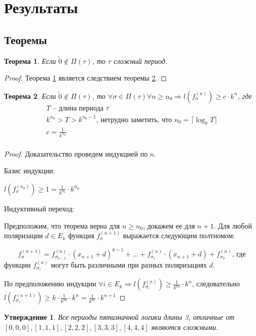 \documentclass[bibliography=totoc, a4paper, 14pt]{extarticle}
\let\stdsection\section
\renewcommand\section{\newpage\stdsection}
\newtheorem{myth}{Теорема}
\newtheorem*{myst}{Утверждение}
\begin{document}
\section{Результаты}
\subsection{Теоремы}
\begin{myth}
\label{th1}
Если $\tilde{0} \not\in \Pi(\tau)$, то $\tau$ сложный период.
\end{myth}
\begin{proof}
Теорема \ref{th1} является следствием теоремы \ref{th2}.
\end{proof}


\begin{myth}
\label{th2}
Если $\tilde{0} \not\in \Pi(\tau)$, то $\forall \sigma \in \Pi(\tau) \forall n \geqslant n_0 \Rightarrow 
l(f_{\sigma}^{(n)}) \geqslant c \cdot k^n$, где
$$
\begin{array}{l}
T \text{ -- длина периода }\tau \\
k^{n_0} > T > k^{n_0 - 1} \text{, нетрудно заметить, что } n_0 = \lceil \log_kT \rceil \\
c = \frac{1}{k^{n_0}} \\
\end{array}
$$
\end{myth}
\begin{proof}
Доказательство проведем индукцией по $n$.

Базис индукции:

$l(f_{\sigma}^{(n_0)}) \geqslant 1 = \frac{1}{k^{n_0}} \cdot k^{n_0}$

Индуктивный переход:

Предположим, что теорема верна для $n \geqslant n_0$, докажем ее для $n+1$.
Для любой поляризации $d \in E_k$ функция $f_{\sigma}^{(n+1)}$ выражается следующим полтномом:

$$f_{\sigma}^{(n+1)} = f_{\sigma_{k-1}}^{(n)}\cdot(x_{n+1}+d)^{k-1} + \ldots +
f_{\sigma_1}^{(n)}\cdot(x_{n+1}+d) + f^{(n)}_{\sigma_0} \text{, где} $$
функции $f_{\sigma_i}^{(n)}$ могут быть различными при разных поляризациях $d$.


По предположению индукции $\forall i \in E_k \Rightarrow l(f_{\sigma_i}^{(n)}) \geqslant
\frac{1}{k^{n_0}} \cdot k^n$, следовательно $l(f_{\sigma_i}^{(n+1)}) \geqslant
k \cdot \frac{1}{k^{n_0}} \cdot k^n = \frac{1}{k^{n_0}} \cdot k^{n+1}$
\end{proof}

\begin{myst} Все периоды пятизначной логики длины 3, отличные от $[0,0,0], [1,1,1],
[2,2,2], [3,3,3], [4,4,4]$ являются сложными.
\end{myst}
\end{document}
